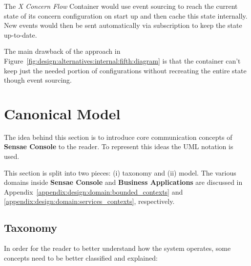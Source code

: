 The \textit{X Concern Flow} Container would use event sourcing to reach the current state of its concern configuration on start up and then cache this state internally. New events would then be sent automatically via subscription to keep the state up-to-date.

The main drawback of the approach in Figure~\ref{fig:design:alternatives:internal:fifth:diagram} is that the container can't keep just the needed portion of configurations without recreating the entire state though event sourcing.

\section{Canonical Model}
\label{sec:design:domain}

The idea behind this section is to introduce core communication concepts of \textbf{Sensae Console} to the reader. To represent this ideas the \gls{UML} notation is used.

This section is split into two pieces: (i) taxonomy and (ii) model.
The various domains inside \textbf{Sensae Console} and \textbf{Business Applications} are discussed in Appendix~\ref{appendix:design:domain:bounded_contexts} and \ref{appendix:design:domain:services_contexts}, respectively.

\subsection{Taxonomy}
\label{subsec:design:domain:taxonomy}

In order for the reader to better understand how the system operates, some concepts need to be better classified and explained:

